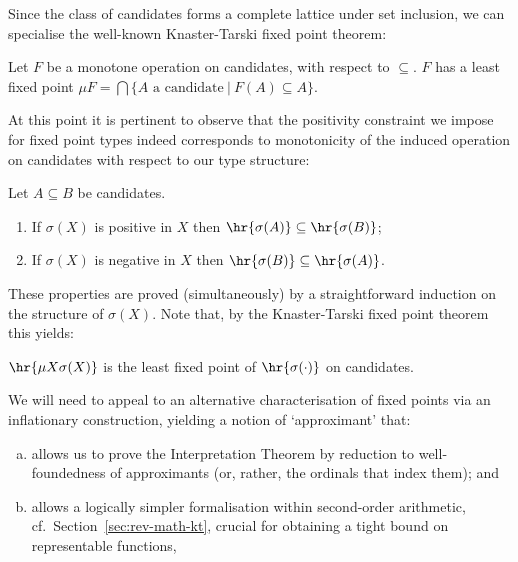 Since the class of candidates forms a complete lattice under set inclusion, we can specialise the well-known Knaster-Tarski fixed point theorem:
\begin{proposition}
    \label{prop:kt-on-candidates}
    Let $F$ be a monotone operation on candidates, with respect to $\subseteq$.
    $F$ has a least fixed point
     $\mu F = \bigcap \{A \text{ a candidate}\ \vert\ F(A)\subseteq A\}$.
\end{proposition}

At this point it is pertinent to observe that the positivity constraint we impose for fixed point types indeed corresponds to monotonicity of the induced operation on candidates with respect to our type structure:
\begin{lemma}
[Monotonicity]
\label{lem:mon-pos-types-in-hr}
Let $A\subseteq B$ be candidates.
\begin{enumerate}
    \item 
If $\sigma(X)$ is positive in $X$ then $\hr{\sigma(A)}\subseteq \hr{\sigma(B)}$; 
\item If $\sigma(X)$ is negative in $X$ then $\hr{\sigma(B)}\subseteq \hr{\sigma(A)}$.
\end{enumerate}
\end{lemma}
These properties are proved (simultaneously) by a straightforward induction on the structure of $\sigma(X)$. 
Note that, by the Knaster-Tarski fixed point theorem this yields:
\begin{proposition}
\label{prop:hr-mu-is-lfp}
    $\hr{\mu X \sigma(X)}$ is the least fixed point of $\hr{\sigma(\cdot)}$ on candidates.
\end{proposition}

We will need to appeal to an alternative characterisation of fixed points via an inflationary construction, yielding a notion of `approximant' that:
\begin{enumerate}[(a)]
    \item allows us to prove the Interpretation Theorem by reduction to well-foundedness of approximants (or, rather, the ordinals that index them); and 
    \item allows a logically simpler formalisation within second-order arithmetic, cf.~Section~\ref{sec:rev-math-kt}, crucial for obtaining a tight bound on representable functions,
\end{enumerate}

